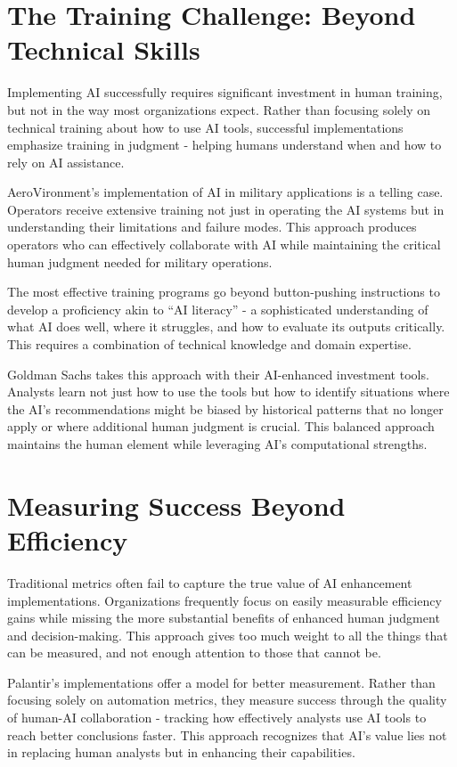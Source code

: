 \documentclass[
  Letterpaper,
]{scrbook}
\begin{document}
\section{The Training Challenge: Beyond Technical
Skills}\label{the-training-challenge-beyond-technical-skills}

Implementing AI successfully requires significant investment in human
training, but not in the way most organizations expect. Rather than
focusing solely on technical training about how to use AI tools,
successful implementations emphasize training in judgment - helping
humans understand when and how to rely on AI assistance.

AeroVironment's implementation of AI in military applications is a
telling case. Operators receive extensive training not just in operating
the AI systems but in understanding their limitations and failure modes.
This approach produces operators who can effectively collaborate with AI
while maintaining the critical human judgment needed for military
operations.

The most effective training programs go beyond button-pushing
instructions to develop a proficiency akin to ``AI literacy'' - a
sophisticated understanding of what AI does well, where it struggles,
and how to evaluate its outputs critically. This requires a combination
of technical knowledge and domain expertise.

Goldman Sachs takes this approach with their AI-enhanced investment
tools. Analysts learn not just how to use the tools but how to identify
situations where the AI's recommendations might be biased by historical
patterns that no longer apply or where additional human judgment is
crucial. This balanced approach maintains the human element while
leveraging AI's computational strengths.

\section{Measuring Success Beyond
Efficiency}\label{measuring-success-beyond-efficiency}

Traditional metrics often fail to capture the true value of AI
enhancement implementations. Organizations frequently focus on easily
measurable efficiency gains while missing the more substantial benefits
of enhanced human judgment and decision-making. This approach gives too
much weight to all the things that can be measured, and not enough
attention to those that cannot be.

Palantir's implementations offer a model for better measurement. Rather
than focusing solely on automation metrics, they measure success through
the quality of human-AI collaboration - tracking how effectively
analysts use AI tools to reach better conclusions faster. This approach
recognizes that AI's value lies not in replacing human analysts but in
enhancing their capabilities.
\end{document}
